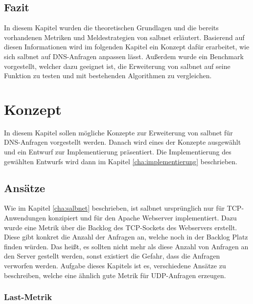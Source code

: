 \documentclass[a4paper, 12pt, BCOR10mm, DIV12, toc=bibliography, toc=listof, german]{scrbook}
\begin{document}

		\section{Fazit} %
		\label{sec:salbnet-fazit}

			In diesem Kapitel wurden die theoretischen Grundlagen und die bereits vorhandenen Metriken und
			Meldestrategien von salbnet erläutert. Basierend auf diesen Informationen wird im folgenden
			Kapitel ein Konzept dafür erarbeitet, wie sich salbnet auf DNS-Anfragen anpassen lässt. Außerdem wurde
			ein Benchmark vorgestellt, welcher dazu geeignet ist, die Erweiterung von salbnet auf seine
			Funktion zu testen und mit bestehenden Algorithmen zu vergleichen.



	\chapter{Konzept} %
	\label{cha:konzept}

	In diesem Kapitel sollen mögliche Konzepte zur Erweiterung von salbnet für DNS-Anfragen
	vorgestellt werden. Danach wird eines der Konzepte ausgewählt und ein Entwurf zur Implementierung
	präsentiert. Die Implementierung des gewählten Entwurfs wird dann im Kapitel
	\ref{cha:implementierung} beschrieben.


		\section{Ansätze} %
		\label{sec:ansaetze}

		Wie im Kapitel \ref{cha:salbnet} beschrieben, ist salbnet ursprünglich nur für TCP-Anwendungen
		konzipiert und für den Apache Webserver implementiert. Dazu wurde eine Metrik über die Backlog
		des TCP-Sockets des Webservers erstellt. Diese gibt konkret die Anzahl der Anfragen an, welche
		noch in der Backlog Platz finden würden. Das heißt, es sollten nicht mehr als diese Anzahl von
		Anfragen an den Server gestellt werden, sonst existiert die Gefahr, dass die Anfragen verworfen
		werden. Aufgabe dieses Kapitels ist es, verschiedene Ansätze zu beschreiben, welche eine ähnlich
		gute Metrik für UDP-Anfragen erzeugen.

		\subsection*{Last-Metrik} %
\end{document}

